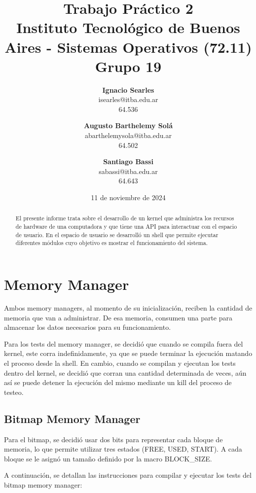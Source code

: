 \documentclass{article}
\title{\textbf{Trabajo Práctico 2} \\ [1ex]
\large Instituto Tecnológico de Buenos Aires - Sistemas Operativos (72.11) \\ [1ex]
\large Grupo 19 }
\date{11 de noviembre de 2024}
\author{
\textbf{Ignacio Searles}\\
isearles@itba.edu.ar\\
64.536
\and
\textbf{Augusto Barthelemy Solá}\\
abarthelemysola@itba.edu.ar\\
64.502
\and
\textbf{Santiago Bassi}\\
sabassi@itba.edu.ar\\
64.643
}
\begin{document}
\maketitle

\begin {abstract}

El presente informe trata sobre el desarrollo de un kernel que administra los recursos de hardware de una computadora y que tiene una API para interactuar con el espacio de usuario. En el espacio de usuario se desarrolló un shell que permite ejecutar diferentes módulos cuyo objetivo es mostrar el funcionamiento del sistema.

\end {abstract}

\section {Memory Manager}

Ambos memory managers, al momento de su inicialización, reciben la cantidad de memoria que van a administrar. De esa memoria, consumen una parte para almacenar los datos necesarios para su funcionamiento.

Para los tests del memory manager, se decidió que cuando se compila fuera del kernel, este corra indefinidamente, ya que se puede terminar la ejecución matando el proceso desde la shell. En cambio, cuando se compilan y ejecutan los tests dentro del kernel, se decidió que corran una cantidad determinada de veces, aún así se puede detener la ejecución del mismo mediante un kill del proceso de testeo.

\subsection {Bitmap Memory Manager}

Para el bitmap, se decidió usar dos bits para representar cada bloque de memoria, lo que permite utilizar tres estados (FREE, USED, START). A cada bloque se le asignó un tamaño definido por la macro BLOCK\_SIZE.

A continuación, se detallan las instrucciones para compilar y ejecutar los tests del bitmap memory manager:
\end{document}
